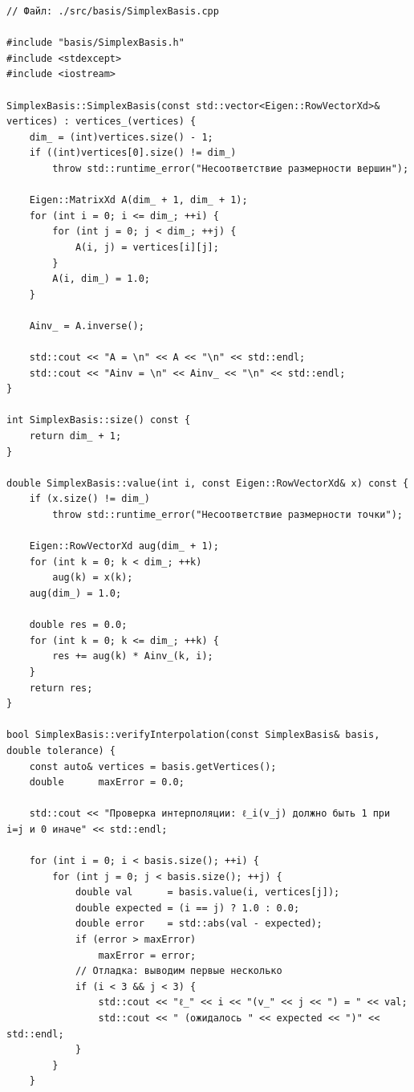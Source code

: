 \documentclass[a4paper,12pt]{article}
\theoremstyle{indented}
\begin{document}
\begin{lstlisting}
// Файл: ./src/basis/SimplexBasis.cpp

#include "basis/SimplexBasis.h"
#include <stdexcept>
#include <iostream>

SimplexBasis::SimplexBasis(const std::vector<Eigen::RowVectorXd>& vertices) : vertices_(vertices) {
    dim_ = (int)vertices.size() - 1;
    if ((int)vertices[0].size() != dim_)
        throw std::runtime_error("Несоответствие размерности вершин");

    Eigen::MatrixXd A(dim_ + 1, dim_ + 1);
    for (int i = 0; i <= dim_; ++i) {
        for (int j = 0; j < dim_; ++j) {
            A(i, j) = vertices[i][j];
        }
        A(i, dim_) = 1.0;
    }

    Ainv_ = A.inverse();

    std::cout << "A = \n" << A << "\n" << std::endl;
    std::cout << "Ainv = \n" << Ainv_ << "\n" << std::endl;
}

int SimplexBasis::size() const {
    return dim_ + 1;
}

double SimplexBasis::value(int i, const Eigen::RowVectorXd& x) const {
    if (x.size() != dim_)
        throw std::runtime_error("Несоответствие размерности точки");

    Eigen::RowVectorXd aug(dim_ + 1);
    for (int k = 0; k < dim_; ++k)
        aug(k) = x(k);
    aug(dim_) = 1.0;

    double res = 0.0;
    for (int k = 0; k <= dim_; ++k) {
        res += aug(k) * Ainv_(k, i);
    }
    return res;
}

bool SimplexBasis::verifyInterpolation(const SimplexBasis& basis, double tolerance) {
    const auto& vertices = basis.getVertices();
    double      maxError = 0.0;

    std::cout << "Проверка интерполяции: ℓ_i(v_j) должно быть 1 при i=j и 0 иначе" << std::endl;

    for (int i = 0; i < basis.size(); ++i) {
        for (int j = 0; j < basis.size(); ++j) {
            double val      = basis.value(i, vertices[j]);
            double expected = (i == j) ? 1.0 : 0.0;
            double error    = std::abs(val - expected);
            if (error > maxError)
                maxError = error;
            // Отладка: выводим первые несколько
            if (i < 3 && j < 3) {
                std::cout << "ℓ_" << i << "(v_" << j << ") = " << val;
                std::cout << " (ожидалось " << expected << ")" << std::endl;
            }
        }
    }


\end{lstlisting}
\end{document}
